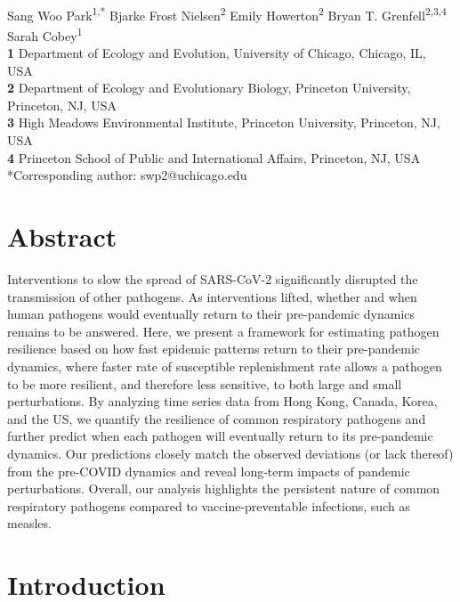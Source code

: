 \documentclass[12pt]{article}
\date{\today}
\begin{document}
\begin{flushleft}{
	\Large
	\textbf{}
}
\newline
\\
Sang Woo Park\textsuperscript{1,*}
Bjarke Frost Nielsen\textsuperscript{2}
Emily Howerton\textsuperscript{2}
Bryan T. Grenfell\textsuperscript{2,3,4}
Sarah Cobey\textsuperscript{1}
\bigskip
\\
\textbf{1} Department of Ecology and Evolution, University of Chicago, Chicago, IL, USA
\\
\textbf{2} Department of Ecology and Evolutionary Biology, Princeton University, Princeton, NJ, USA
\\
\textbf{3} High Meadows Environmental Institute, Princeton University, Princeton, NJ, USA
\\
\textbf{4} Princeton School of Public and International Affairs, Princeton, NJ, USA
\bigskip
*Corresponding author: swp2@uchicago.edu
\end{flushleft}

\section*{Abstract}

Interventions to slow the spread of SARS-CoV-2 significantly disrupted the transmission of other pathogens. 
As interventions lifted, whether and when human pathogens would eventually return to their pre-pandemic dynamics remains to be answered.
Here, we present a framework for estimating pathogen resilience based on how fast epidemic patterns return to their pre-pandemic dynamics, where faster rate of susceptible replenishment rate allows a pathogen to be more resilient, and therefore less sensitive, to both large and small perturbations.  
By analyzing time series data from Hong Kong, Canada, Korea, and the US, we quantify the resilience of common respiratory pathogens and further predict when each pathogen will eventually return to its pre-pandemic dynamics.
Our predictions closely match the observed deviations (or lack thereof) from the pre-COVID dynamics and reveal long-term impacts of pandemic perturbations.
Overall, our analysis highlights the persistent nature of common respiratory pathogens compared to vaccine-preventable infections, such as measles.

\pagebreak

\section*{Introduction}
\end{document}
